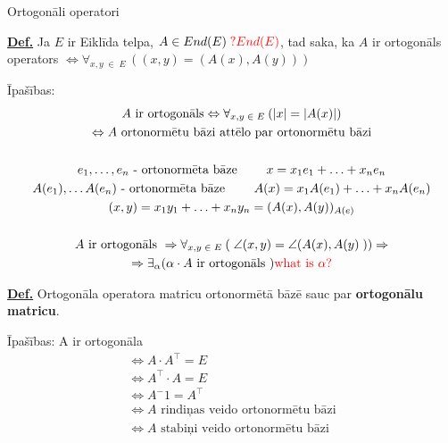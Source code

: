 \documentclass[12pt]{article}
\begin{document}
\pagebreak

Ortogonāli operatori %

\textbf{\underline{Def.}} Ja $E$ ir Eiklīda telpa, $A \in End(E) \color{red}{ \; ? End(E)} $, tad saka, ka $A$ ir ortogonāls operators $\Leftrightarrow \forall_{x,y \; \in \; E \;} ((x,y) = (A(x), A(y)))$ 

Īpašības: %
\begin{gather*}
	A \text{ ir ortogonāls} \Leftrightarrow  \forall_{x,y \; \in \; E \;} (|x| = |A(x)|) \\ 
	\Leftrightarrow A \text{ ortonormētu bāzi  attēlo par ortonormētu bāzi} \\ %
	\\
	e_1, \ldots, e_n \text{ - ortonormēta bāze } \quad  \quad x = x_1e_1 + \ldots + x_ne_n \\
	A(e_1), \ldots A(e_n)  \text{ - ortonormēta bāze } \quad  \quad A(x) = x_1A(e_1) + \ldots + x_nA(e_n) \\
	(x,y) = x_1y_1 + \ldots + x_ny_n = (A(x), A(y))_{A(e)} \\
	\\
	A \text{ ir ortogonāls } \Rightarrow \forall_{x,y \; \in \; E \;} ( \; \angle(x,y) = \angle(A(x), A(y) \; )) \Rightarrow \\
	\Rightarrow \exists_\alpha (\alpha \cdot A \text{ ir ortogonāls }) \color{red}{\text{what is } \alpha ? }\\ 
\end{gather*}

\textbf{\underline{Def.}} Ortogonāla operatora matricu ortonormētā bāzē sauc par \textbf{ortogonālu matricu}.

Īpašības: %
A ir ortogonāla
\begin{gather*} %
	 \Leftrightarrow A \cdot A^{\intercal} = E \\
	 \Leftrightarrow A^{\intercal} \cdot A = E \\
	 \Leftrightarrow A^-1 = A^{\intercal} \\
	 \Leftrightarrow A \text{ rindiņas veido ortonormētu bāzi} \\
	 \Leftrightarrow A \text{ stabiņi veido ortonormētu bāzi} \\
\end{gather*}

\begin{gather}
\end{gather}
\end{document}
